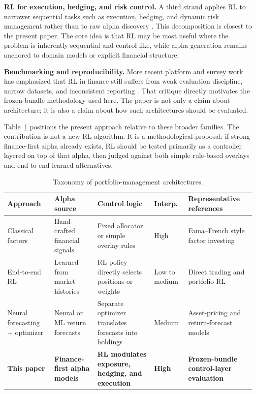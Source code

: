 \documentclass[10pt,twocolumn]{article}
\begin{document}
\textbf{RL for execution, hedging, and risk control.} A third strand applies RL
to narrower sequential tasks such as execution, hedging, and dynamic risk
management rather than to raw alpha discovery \cite{nevmyvaka2006,kolm2019hedge,
buehler2019,du2020}. This decomposition is closest to the present paper. The
core idea is that RL may be most useful where the problem is inherently
sequential and control-like, while alpha generation remains anchored to domain
models or explicit financial structure.

\textbf{Benchmarking and reproducibility.} More recent platform and survey work
has emphasized that RL in finance still suffers from weak evaluation discipline,
narrow datasets, and inconsistent reporting \cite{sun2023,jander2025}. That
critique directly motivates the frozen-bundle methodology used here. The paper
is not only a claim about architecture; it is also a claim about how such
architectures should be evaluated.

Table~\ref{tab:taxonomy} positions the present approach relative to these
broader families. The contribution is not a new RL algorithm. It is a
methodological proposal: if strong finance-first alpha already exists, RL should
be tested primarily as a controller layered on top of that alpha, then judged
against both simple rule-based overlays and end-to-end learned alternatives.

\begin{table}[t]
\centering
\scriptsize
\caption{Taxonomy of portfolio-management architectures.}
\label{tab:taxonomy}
\begin{tabular}{@{} >{\raggedright\arraybackslash}p{2.1cm}
                >{\raggedright\arraybackslash}p{2.1cm}
                >{\raggedright\arraybackslash}p{2.15cm}
                >{\raggedright\arraybackslash}p{1.45cm}
                >{\raggedright\arraybackslash}p{4.2cm} @{}}
\toprule
\textbf{Approach} & \textbf{Alpha source} & \textbf{Control logic} & \textbf{Interp.} & \textbf{Representative references} \\
\midrule
Classical factors & Hand-crafted financial signals & Fixed allocator or simple overlay rules & High & Fama--French style factor investing \cite{fama1993} \\
End-to-end RL & Learned from market histories & RL policy directly selects positions or weights & Low to medium & Direct trading and portfolio RL \cite{moody2001,jiang2017,zhang2020,cong2021} \\
Neural forecasting + optimizer & Neural or ML return forecasts & Separate optimizer translates forecasts into holdings & Medium & Asset-pricing and return-forecast models \cite{gu2020,chen2021,giglio2022} \\
\textbf{This paper} & \textbf{Finance-first alpha models} & \textbf{RL modulates exposure, hedging, and execution} & \textbf{High} & \textbf{Frozen-bundle control-layer evaluation} \\
\bottomrule
\end{tabular}
\end{table}
\end{document}
